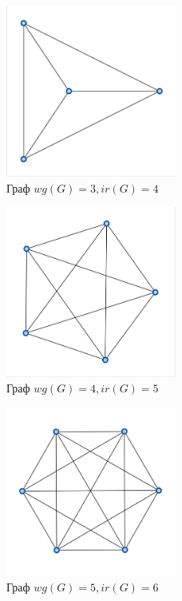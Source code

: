 \documentclass[bachelor, och, nir]{SCWorks}
\begin{document}
\begin{figure}[ht!]  
    \centering 
    \includegraphics[width=0.5\textwidth]
{3.jpeg}  
    \caption{Граф $wg(G) = 3, ir(G) = 4$} 
    \label{fig:im2} 
\end{figure}

\begin{figure}[ht!]  
    \centering 
    \includegraphics[width=0.5\textwidth]
{4.jpeg}  
    \caption{Граф $wg(G) = 4 , ir(G) = 5 $} 
    \label{fig:im2} 
\end{figure}


\begin{figure}[ht!]  
    \centering 
    \includegraphics[width=0.5\textwidth]
{5.jpeg}  
    \caption{Граф $wg(G) = 5 , ir(G) = 6$} 
    \label{fig:im2} 
\end{figure}
\end{document}
